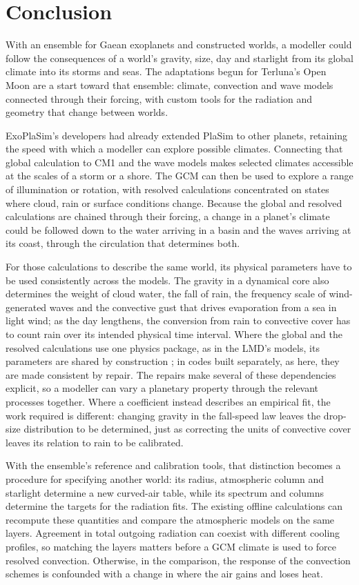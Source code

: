 \section{Conclusion}

With an ensemble for Gaean exoplanets and constructed worlds, a modeller could follow the consequences of a world's gravity, size, day and starlight from its global climate into its storms and seas. The adaptations begun
for Terluna's Open Moon are a start toward that ensemble: climate, convection and wave models
connected through their forcing, with custom tools for the radiation and geometry that change between worlds.

ExoPlaSim's developers had already extended PlaSim to other planets, retaining the speed with which a
modeller can explore possible climates. Connecting that global calculation to CM1 and the wave models
makes selected climates accessible at the scales of a storm or a shore. The GCM can then be used to explore a
range of illumination or rotation, with resolved calculations concentrated on states where cloud, rain or
surface conditions change. Because the global and resolved calculations are chained through their forcing, a change in a planet's climate could be followed down to the water arriving in a basin and the waves arriving at its coast, through the circulation that
determines both.

For those calculations to describe the same world, its physical parameters have to be used consistently
across the models. The gravity in a dynamical core also determines the weight of cloud water, the fall
of rain, the frequency scale of wind-generated waves and the convective gust that drives evaporation from a sea in
light wind; as the day lengthens, the conversion from rain
to convective cover has to count rain over its intended physical time interval. Where the global and the resolved calculations use one physics package, as in the LMD's models, its parameters are shared by construction
\autocite{spiga2009new}; in codes built separately, as here, they are made consistent by repair. The repairs make
several of these dependencies explicit, so a modeller can vary a planetary property through the relevant processes together. Where a
coefficient instead describes an empirical fit, the work required is different: changing gravity in the
fall-speed law leaves the drop-size distribution to be determined, just as correcting the units of
convective cover leaves its relation to rain to be calibrated.

With the ensemble's reference and calibration tools, that distinction becomes a procedure for specifying
another world: its radius, atmospheric column and starlight determine a new curved-air table, while its spectrum and
columns determine the targets for the radiation fits. The existing offline calculations can recompute these
quantities and compare the atmospheric models on the same layers. Agreement in total outgoing radiation
can coexist with different cooling profiles, so matching the layers matters before a GCM climate is used
to force resolved convection. Otherwise, in the comparison, the response of the convection schemes is confounded with a change in where the air gains and loses heat.

